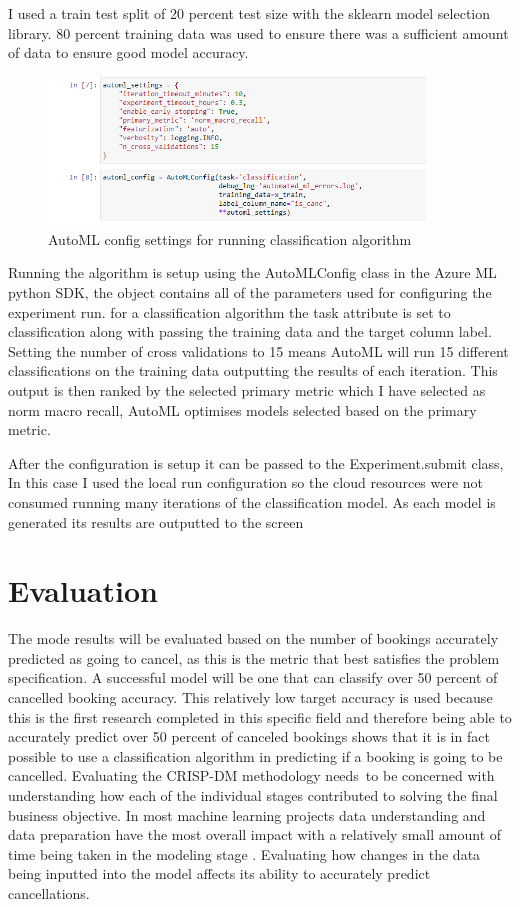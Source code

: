 I used a train test split of 20 percent test size with the sklearn model selection library. 80 percent training data was used to ensure there was a sufficient amount of data to ensure good model accuracy. 

\begin{figure}[hbt!]
 \includegraphics[width=10cm]{figures/auto_ml_settings.png}
 \caption{AutoML config settings for running classification algorithm}
\end{figure}

Running the algorithm is setup using the AutoMLConfig class in the Azure ML python SDK, the object contains all of the parameters used for configuring the experiment run. for a classification algorithm the task attribute is set to classification along with passing the training data and the target column label. Setting the number of cross validations to 15 means AutoML will run 15 different classifications on the training data outputting the results of each iteration. This output is then ranked by the selected primary metric which I have selected as norm macro recall, AutoML optimises models selected based on the primary metric. 

After the configuration is setup it can be passed to the Experiment.submit class, In this case I used the local run configuration so the cloud resources were not consumed running many iterations of the classification model. As each model is generated its results are outputted to the screen

\section{Evaluation}

The mode results will be evaluated based on the number of bookings accurately predicted as going to cancel, as this is the metric that best satisfies the problem specification. A successful model will be one that can classify over 50 percent of cancelled booking accuracy. This relatively low target accuracy is used because this is the first research completed in this specific field and therefore being able to accurately predict over 50 percent of canceled bookings shows that it is in fact possible to use a classification algorithm in predicting if a booking is going to be cancelled. Evaluating the CRISP-DM methodology needs to be concerned with understanding how each of the individual stages contributed to solving the final business objective. In most machine learning projects data understanding and data preparation have the most overall impact with a relatively small amount of time being taken in the modeling stage \cite{Polyzotis2018DataSurvey}. Evaluating how changes in the data being inputted into the model affects its ability to accurately predict cancellations.

